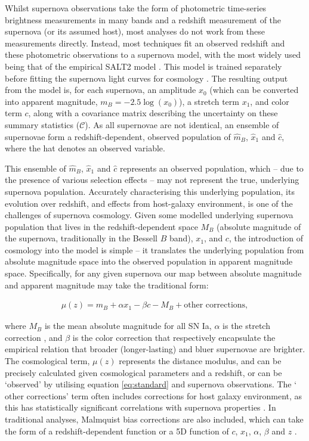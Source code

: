 \documentclass[a4paper,fleqn,usenatbib]{mnras}
\newcommand{\green}{\color{forestgreen}}
\begin{document}
Whilst supernova observations take the form of photometric time-series brightness measurements in many bands {\green and a redshift measurement of the supernova (or its assumed host)}, most analyses do not work from these measurements directly. Instead, most techniques fit an observed redshift and these photometric observations to a supernova model, with the most widely used being that of the empirical SALT2 model \citep{Guy2007, Guy2010}. This model is trained separately before fitting the supernova light curves for cosmology \citep{Guy2010, Betoule2014}. The resulting output from the model is, for each supernova, an amplitude $x_0$ (which can be converted into apparent magnitude, $m_B = -2.5\log(x_0)$), a stretch term $x_1$, and color term $c$, along with a covariance matrix describing the uncertainty on these summary statistics ($\mathcal{C}$). As all supernovae are not identical, an ensemble of supernovae form a redshift-dependent, observed population of $\hat{m}_B$, $\hat{x}_1$ and $\hat{c}$, where the hat denotes an observed variable.

This {\green ensemble of $\hat{m}_B$, $\hat{x}_1$ and $\hat{c}$} represents an observed population, which -- due to the presence of various selection effects -- may not represent the true, underlying supernova population. Accurately characterising this underlying population, its evolution over redshift, and effects from {\green host-galaxy} environment, is one of the challenges of supernova cosmology. Given some modelled underlying supernova population that lives in the redshift-dependent space $M_B$ {\green(absolute magnitude of the supernova, traditionally in the Bessell $B$ band)}, $x_1$, and $c$, the introduction of cosmology into the model is simple -- it translates the underlying population from absolute magnitude space into the observed population in apparent magnitude space. Specifically, for any given supernova our map between absolute magnitude and apparent magnitude may take the traditional form:

\begin{align}
\mu(z) = m_B + \alpha x_1 - \beta c - M_B + \text{other corrections}, \label{eq:standard}
\end{align}

where $M_B$ is the mean absolute magnitude for all SN Ia,  $\alpha$ is the stretch correction \citep{Phillips1993, Phillips1999}, and $\beta$ is the color correction \citep{Tripp1998} that respectively encapsulate the empirical relation that broader (longer-lasting) and bluer supernovae are brighter. The cosmological term, $\mu(z)$ represents the distance modulus, and can be precisely calculated given cosmological parameters and a redshift, or can be `observed' by {\green utilising equation \eqref{eq:standard} and supernova observations}. The `$\text{other corrections}$' term often includes corrections for host galaxy environment, as this has statistically significant correlations with supernova properties \citep{Kelly2010, Lampeitl2010, Sullivan2010, DAndrea2011, Gupta2011, Johansson2013, Rigault2013, Uddin2017}. In traditional analyses, Malmquist bias corrections are also included, which can take the form of a redshift-dependent function \citep{Betoule2014} or a 5D function of $c$, $x_1$, $\alpha$, $\beta$ and $z$ \citep{Scolnic2017}.
\end{document}
